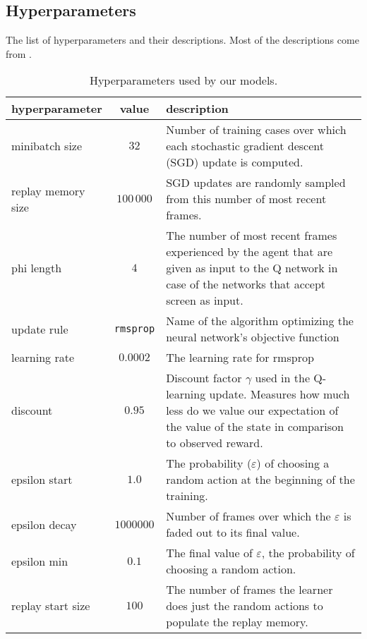 \begin{appendices}
\chapter{Hyperparameters}\label{hyperparams}
The list of hyperparameters and their descriptions. Most of the descriptions come from \cite{nature-dqn}.
\begin{table}[h]
\begin{tabularx}{\textwidth}{@{} l c Y @{}}
\toprule
hyperparameter & value & description \\
\midrule
minibatch size & $32$ & Number of training cases over which each stochastic gradient descent (SGD) update is computed. \\\addlinespace
replay memory size & $100\,000$ & SGD updates are randomly sampled from this number of most recent frames. \\\addlinespace
phi length & $4$ & The number of most recent frames experienced by the agent that are given as input to the Q network in case of the networks that accept screen as input. \\\addlinespace
update rule & \texttt{rmsprop} &  Name of the algorithm optimizing the neural network's objective function   \\ \addlinespace
learning rate &  $0.0002$  & The learning rate for rmsprop\\ \addlinespace
discount & $0.95$ & Discount factor $\gamma$ used in the Q-learning update. Measures how much less do we value our expectation of the value of the state in comparison to observed reward.\\\addlinespace
epsilon start & $1.0$ & The probability ($\varepsilon$) of choosing a random action at the beginning of the training. \\\addlinespace
epsilon decay & $1000000$ & Number of frames over which the $\varepsilon$ is faded out to its final value. \\\addlinespace
epsilon min & $0.1$ & The final value of $\varepsilon$, the probability of choosing a random action. \\\addlinespace
replay start size & $100$ & The number of frames the learner does just the random actions to populate the replay memory.\\
\bottomrule
\end{tabularx}
\caption{Hyperparameters used by our models.}
\label{table:param}
\end{table}

\end{appendices}
